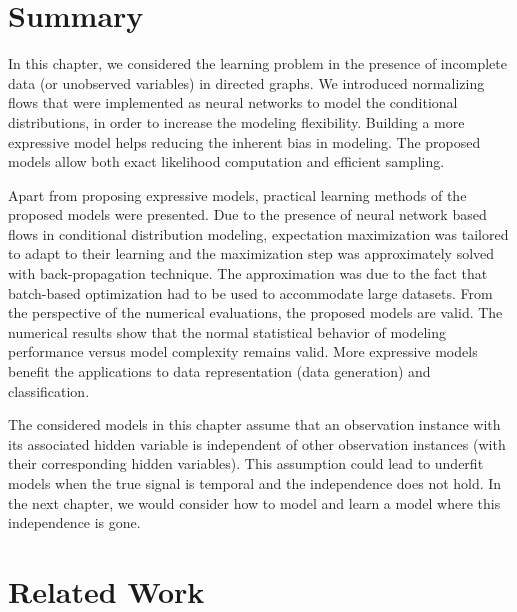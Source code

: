 \section{Summary}
In this chapter, we considered the learning problem in the presence of incomplete data (or unobserved variables) in directed graphs. We introduced normalizing flows that were implemented as neural networks to model the conditional distributions, in order to increase the modeling flexibility. Building a more expressive model helps reducing the inherent bias in modeling. The proposed models allow both exact likelihood computation and efficient sampling.

Apart from proposing expressive models, practical learning methods of the proposed models were presented. Due to the presence of neural network based flows in conditional distribution modeling, expectation maximization was tailored to adapt to their learning and the maximization step was approximately solved with back-propagation technique. The approximation was due to the fact that batch-based optimization had to be used to accommodate large datasets. From the perspective of the numerical evaluations, the proposed models are valid. The numerical results show that the normal statistical behavior of modeling performance versus model complexity remains valid. More expressive models benefit the applications to data representation (data generation) and classification.

The considered models in this chapter assume that an observation instance with its associated hidden variable is independent of other observation instances (with their corresponding hidden variables). This assumption could lead to underfit models when the true signal is temporal and the independence does not hold. In the next chapter, we would consider how to model and learn a model where this independence is gone. 

\section{Related Work}

